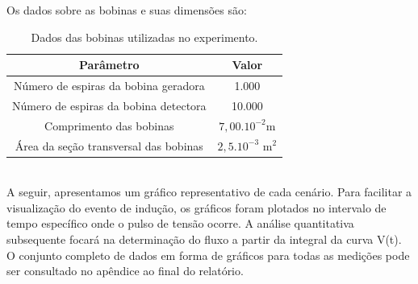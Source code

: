 \documentclass[column,brazilian,12pt,a4paper,final]{article}
\begin{document}
Os dados sobre as bobinas e suas dimensões são: 
\begin{table}[!htb]
    \centering
    \begin{tabular}{|c|c|}
        \hline
        Parâmetro & Valor \\
        \hline
        Número de espiras da bobina geradora & 1.000 \\
        Número de espiras da bobina detectora & 10.000 \\
        Comprimento das bobinas & $7,00.10^{-2} $m \\
        Área da seção transversal das bobinas & $2,5.10^{-3}$ m$^2$ \\
        \hline
    \end{tabular}
    \caption{Dados das bobinas utilizadas no experimento.}
    \label{tab:bobinas_dados}
\end{table}\\

A seguir, apresentamos um gráfico representativo de cada cenário. Para facilitar a visualização do evento de indução, os gráficos foram plotados no intervalo de tempo específico onde o pulso de tensão ocorre. A análise quantitativa subsequente focará na determinação do fluxo a partir da integral da curva V(t). O conjunto completo de dados em forma de gráficos para todas as medições pode ser consultado no apêndice ao final do relatório.
\end{document}
